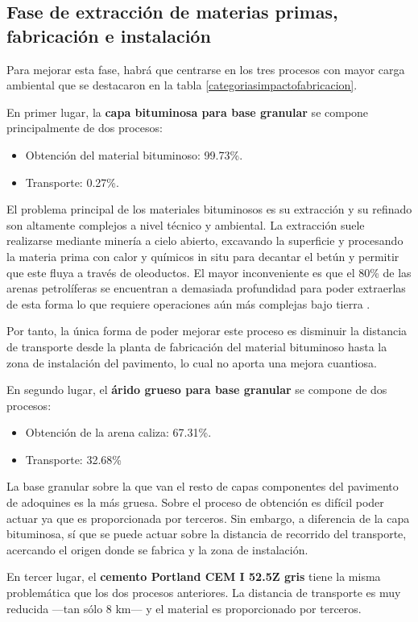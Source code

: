 \subsection{Fase de extracción de materias primas, fabricación e instalación}
Para mejorar esta fase, habrá que centrarse en los tres procesos con mayor carga ambiental que se destacaron en la tabla \ref{categoriasimpactofabricacion}.

En primer lugar, la \textbf{capa bituminosa para base granular} se compone principalmente de dos procesos:
\begin{itemize}
  \item Obtención del material bituminoso: 99.73\%.
  \item Transporte: 0.27\%.
\end{itemize}

El problema principal de los materiales bituminosos es su extracción y su refinado son altamente complejos a nivel técnico y ambiental. La extracción suele realizarse mediante minería a cielo abierto, excavando la superficie y procesando la materia prima con calor y químicos in situ para decantar el betún y permitir que este fluya a través de oleoductos. El mayor inconveniente es que el 80\% de las arenas petrolíferas se encuentran a demasiada profundidad para poder extraerlas de esta forma lo que requiere operaciones aún más complejas bajo tierra \cite{eurobitume}.

Por tanto, la única forma de poder mejorar este proceso es disminuir la distancia de transporte desde la planta de fabricación del material bituminoso hasta la zona de instalación del pavimento, lo cual no aporta una mejora cuantiosa.

En segundo lugar, el \textbf{árido grueso para base granular} se compone de dos procesos:
\begin{itemize}
  \item Obtención de la arena caliza: 67.31\%.
  \item Transporte: 32.68\%
\end{itemize}

La base granular sobre la que van el resto de capas componentes del pavimento de adoquines es la más gruesa. Sobre el proceso de obtención es difícil poder actuar ya que es proporcionada por terceros. Sin embargo, a diferencia de la capa bituminosa, sí que se puede actuar sobre la distancia de recorrido del transporte, acercando el origen donde se fabrica y la zona de instalación.

En tercer lugar, el \textbf{cemento Portland CEM I 52.5Z gris} tiene la misma problemática que los dos procesos anteriores. La distancia de transporte es muy reducida —tan sólo 8 \si{km}— y el material es proporcionado por terceros.

